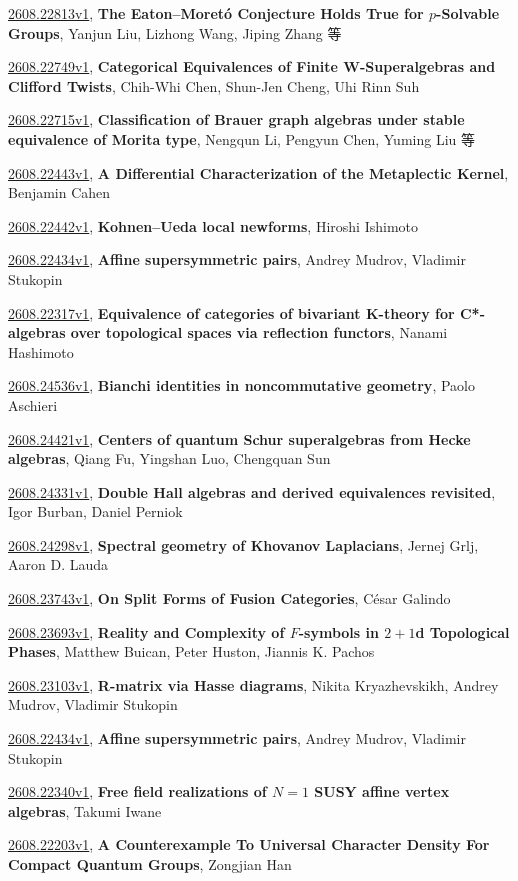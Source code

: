 \documentclass[9pt, a4paper]{article}
\theoremstyle{plain}
\theoremstyle{definition}
\theoremstyle{remark}
\newcommand{\arxiv}[3]{\href{https://arxiv.org/abs/#1}{#1}, \textbf{\textcolor{arxivblue}{#2}}, #3}
\begin{document}
\arxiv{2608.22813v1}{The Eaton--Moretó Conjecture Holds True for \(p\)-Solvable Groups}{Yanjun Liu, Lizhong Wang, Jiping Zhang 等}

\arxiv{2608.22749v1}{Categorical Equivalences of Finite W-Superalgebras and Clifford Twists}{Chih-Whi Chen, Shun-Jen Cheng, Uhi Rinn Suh}

\arxiv{2608.22715v1}{Classification of Brauer graph algebras under stable equivalence of Morita type}{Nengqun Li, Pengyun Chen, Yuming Liu 等}

\arxiv{2608.22443v1}{A Differential Characterization of the Metaplectic Kernel}{Benjamin Cahen}

\arxiv{2608.22442v1}{Kohnen--Ueda local newforms}{Hiroshi Ishimoto}

\arxiv{2608.22434v1}{Affine supersymmetric pairs}{Andrey Mudrov, Vladimir Stukopin}

\arxiv{2608.22317v1}{Equivalence of categories of bivariant K-theory for C*-algebras over topological spaces via reflection functors}{Nanami Hashimoto}

\arxiv{2608.24536v1}{Bianchi identities in noncommutative geometry}{Paolo Aschieri}

\arxiv{2608.24421v1}{Centers of quantum Schur superalgebras from Hecke algebras}{Qiang Fu, Yingshan Luo, Chengquan Sun}

\arxiv{2608.24331v1}{Double Hall algebras and derived equivalences revisited}{Igor Burban, Daniel Perniok}

\arxiv{2608.24298v1}{Spectral geometry of Khovanov Laplacians}{Jernej Grlj, Aaron D. Lauda}

\arxiv{2608.23743v1}{On Split Forms of Fusion Categories}{César Galindo}

\arxiv{2608.23693v1}{Reality and Complexity of $F$-symbols in $2+1$d Topological Phases}{Matthew Buican, Peter Huston, Jiannis K. Pachos}

\arxiv{2608.23103v1}{R-matrix via Hasse diagrams}{Nikita Kryazhevskikh, Andrey Mudrov, Vladimir Stukopin}

\arxiv{2608.22434v1}{Affine supersymmetric pairs}{Andrey Mudrov, Vladimir Stukopin}

\arxiv{2608.22340v1}{Free field realizations of $N=1$ SUSY affine vertex algebras}{Takumi Iwane}

\arxiv{2608.22203v1}{A Counterexample To Universal Character Density For Compact Quantum Groups}{Zongjian Han}

\end{document}
